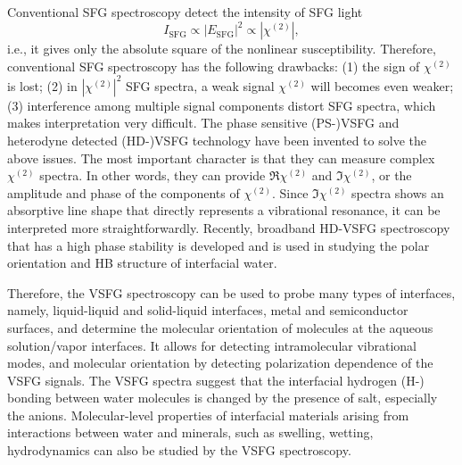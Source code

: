 Conventional SFG spectroscopy detect the intensity of SFG light
\begin{equation}
I_{\text{SFG}}\propto |E_{\text{SFG}}|^2 \propto |\chi^{(2)}|,
\label{eq:sfg_intensity}
\end{equation}
i.e., it gives only the absolute square of the nonlinear susceptibility. Therefore, conventional SFG spectroscopy has the following drawbacks\cite{Nihonyanagi2013}:
(1) the sign of $\chi^{(2)}$ is lost; 
(2) in $|\chi^{(2)}|^2$ SFG spectra, a weak signal $\chi^{(2)}$  will becomes even weaker;
(3) interference among multiple signal components distort SFG spectra, which makes interpretation very difficult.
The phase sensitive (PS-)VSFG\cite{Ji2008} and heterodyne detected (HD-)VSFG technology have been invented to solve the above 
issues. The most important character is that they can measure complex $\chi^{(2)}$ spectra. 
In other words, they can provide $\Re \chi^{(2)}$ and $\Im \chi^{(2)}$, or the amplitude and phase of the components of $\chi^{(2)}$. 
Since $\Im \chi^{(2)}$ spectra shows an absorptive line shape that directly represents a vibrational resonance, 
it can be interpreted more straightforwardly\cite{Nihonyanagi2013}.
Recently, broadband HD-VSFG spectroscopy that has a high phase stability is developed and is used in studying the polar orientation and HB structure of interfacial
water\cite{Nihonyanagi2009,Shen2013}. 


Therefore, the VSFG spectroscopy can be used to probe many types of interfaces, namely, liquid-liquid and 
solid-liquid interfaces\cite{Guyot-Sionnest1987,RS91,Du93,QD94,Richmond02,Gopalakrishnan2006,ShenYR2006,Morita2008}, metal and semiconductor surfaces\cite{Harris87,Superfine88},
and determine the molecular orientation of molecules at the aqueous solution/vapor interfaces.
It allows for detecting intramolecular vibrational modes, and molecular orientation by detecting polarization dependence of the VSFG signals\cite{Vidal05}.  
The VSFG spectra suggest that the interfacial hydrogen (H-) bonding between water molecules is changed by the presence of salt, 
especially the anions\cite{EAR04}.
Molecular-level properties of interfacial materials arising from interactions between water and minerals, 
such as swelling, wetting, hydrodynamics can also be studied by the VSFG spectroscopy\cite{Rotenberg14}.


